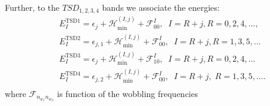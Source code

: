 \documentclass[twocolumn,article,amsmath,amssymb,floatfix,aps]{revtex4}
\begin{document}
Further, to the $TSD_{1,2,3,4}$ bands we associate the energies:
\begin{eqnarray}
  &&  E_I^\text{TSD1}=\epsilon_{j} + \mathcal{H}_\text{min}^{(I,j)}+\mathcal{F}_{00}^I , \;\;I=R+j, R=0,2,4,. . . ,\nonumber \\
  &&  E_I^\text{TSD2}=\epsilon_{j,1} + \mathcal{H}_\text{min}^{(I,j)}+\mathcal{F}_{00}^I , \;\;I=R+j, R=1,3,5,. . . \nonumber\\
  &&  E_I^\text{TSD3}=\epsilon_{j} + \mathcal{H}_\text{min}^{(I,j)}+\mathcal{F}_{10}^I, \;\; I=R+j, R=0,2,4,. . .  \nonumber\\
  &&  E_I^\text{TSD4}=\epsilon_{j,2} + \mathcal{H}_\text{min}^{(I,j)}+\mathcal{F}_{00}^I,\;\;I=R+j,\;R=1,3,5,. . . . \nonumber\\ \label{wobbling_energies}
\end{eqnarray}
where $\mathcal{F}_{n_{w_1}n_{w_2}}$ is function of the wobbling frequencies
\end{document}

